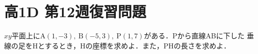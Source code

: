 \documentclass[dvipdfmx,uplatex,b5paper]{jsarticle}
\begin{document}
\section*{高1D 第12週復習問題}
$xy$平面上に$\text{A}(1,-3),\ \text{B}(-5,3),\ \text{P}(1,7)$がある．Pから直線ABに下した
垂線の足をHとするとき，Hの座標を求めよ．また，PHの長さを求めよ．
\end{document}

